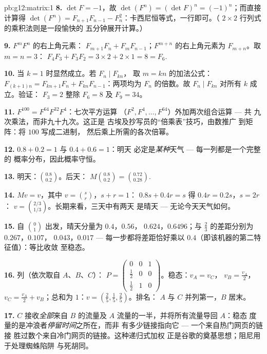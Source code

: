 \begin{solution}{pb:g12:matrix:1}
\textbf{8.} $\det F = -1$，故
$\det(F^n) = (\det F)^n = (-1)^n$；而直接计算得
$\det(F^n) = F_{n+1}F_{n-1} - F_n^2$：卡西尼恒等式，一行即可。（
$2 \times 2$ 行列式的乘积法则是一段愉快的
五分钟展开计算。）

\textbf{9.} $F^m F^n$ 的右上角元素：
$F_{m+1}F_n + F_m F_{n-1}$；$F^{m+n}$ 的右上角元素为
$F_{m+n}$。取 $m = n = 3$：
$F_4 F_3 + F_3 F_2 = 3 \times 2 + 2 \times 1 = 8 = F_6$.

\textbf{10.} 当 $k = 1$ 时显然成立。若 $F_n \mid F_{kn}$，
取 $m = kn$ 的加法公式：
$F_{(k+1)n} = F_{kn+1}F_n + F_{kn}F_{n-1}$：两项均为
$F_n$ 的倍数。故 $F_n \mid F_{kn}$ 对所有 $k$ 成立。验证：
$F_3 = 2$ 整除 $F_6 = 8$ 及 $F_9 = 34$。

\textbf{11.} $F^{100} = F^{64} F^{32} F^4$：七次平方运算
（$F^2, F^4, \dots, F^{64}$）外加两次组合运算 --- 共
九次乘法，而非九十九次。这正是
古埃及抄写员的“倍乘表”技巧，由数推广
到矩阵：将 $100$ 写成二进制，
然后乘上所需的各次倍幂。

\textbf{12.} $0.8 + 0.2 = 1$ 与 $0.4 + 0.6 = 1$：明天
必定是\emph{某种}天气 --- 每一列都是一个完整的
概率分布，因此概率守恒。

\textbf{13.} 明天：$\binom{0.8}{0.2}$。后天：
$M\binom{0.8}{0.2} = \binom{0.72}{0.28}$.

\textbf{14.} $Mv = v$，其中 $v = \binom{s}{r}$，$s + r = 1$：
$0.8s + 0.4r = s$ 得 $0.4r = 0.2s$，$s = 2r$：
$v = \binom{2/3}{1/3}$。长期来看，三天中有两天
是晴天 --- 无论今天天气如何。

\textbf{15.} 自 $\binom01$ 出发，晴天分量为 $0.4$，$0.56$，
$0.624$，$0.6496$；与 $\frac23$ 的差距分别为 $0.267$，$0.107$，
$0.043$，$0.017$ --- 每一步都将差距恰好乘以
$0.4$（即该机器的第二特征值）：等比收敛
至稳态。

\textbf{16.} 列（依次取自 $A$、$B$、$C$）：
$P = \begin{pmatrix} 0 & 0 & 1\\ \frac12 & 0 & 0\\
\frac12 & 1 & 0\end{pmatrix}$。稳态：$v_A = v_C$，
$v_B = \frac{v_A}{2}$，$v_C = \frac{v_A}{2} + v_B$；总和为
$1$：$v = \left(\frac25, \frac15, \frac25\right)$。排名：
$A$ 与 $C$ 并列第一，$B$ 居末。

\textbf{17.} $C$ 接收\emph{全部}来自 $B$ 的流量及
$A$ 流量的一半，并将所有流量导回 $A$：稳态
度量的是冲浪者\emph{停留时间}之所在，而非
有多少链接指向它 --- 一个来自热门网页的链接
胜过数个来自冷门网页的链接。这种递归式加权
正是谷歌的奠基思想；阻尼用于处理蜘蛛陷阱
与死胡同。


\end{solution}
